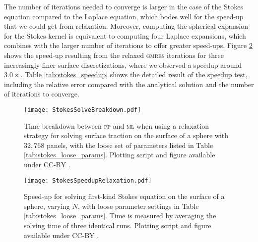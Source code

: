 \documentclass[smallcondensed,final]{svjour3}
\newcommand{\mtol}{\textsc{m}\texttwooldstyle\textsc{l}\xspace} %
\newcommand{\ptop}{\textsc{p}\texttwooldstyle\textsc{p}\xspace} %
\newcommand{\gmres}{\textsc{gmres}\xspace}
\begin{document}
The number of iterations needed to converge is larger in the case of the Stokes equation compared to the Laplace equation, which bodes well for the speed-up that we could get from relaxation. Moreover, computing the spherical expansion for the Stokes kernel is equivalent to computing four Laplace expansions, which combines with the larger number of iterations to offer greater speed-ups. Figure \ref{fig:stokes_speedup} shows the speed-up resulting from the relaxed \gmres iterations for three increasingly finer surface discretizations, where we observed a speedup around $3.0\times$. Table \ref{tab:stokes_speedup} shows the detailed result of the speedup test, including the relative error compared with the analytical solution and the number of iterations to converge.


\begin{figure}%
\begin{center}
	\texttt{[image: StokesSolveBreakdown.pdf]}
	\caption{Time breakdown between {\ptop} and {\mtol} when using a relaxation strategy for solving surface traction on the surface of a sphere with $32,768$ panels, with the loose set of parameters listed in Table \ref{tab:stokes_loose_params}. Plotting script and figure available under CC-BY \cite{WangLaytonBarba2016-figshare3}.}
	\label{fig:stokes_relaxation_breakdown}
\end{center}
\end{figure}


\begin{figure}%
\begin{center}
	\texttt{[image: StokesSpeedupRelaxation.pdf]}
	\caption{Speed-up for solving first-kind Stokes equation on the surface of a sphere, varying $N$, with loose parameter settings in Table \ref{tab:stokes_loose_params}. Time is measured by averaging the solving time of three identical runs. Plotting script and figure available under CC-BY \cite{WangLaytonBarba2016-figshare3}.}
	\label{fig:stokes_speedup}
\end{center}
\end{figure}
\end{document}

